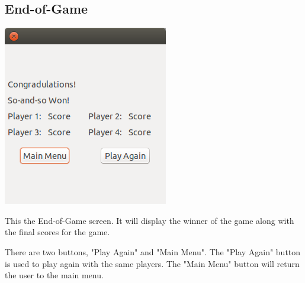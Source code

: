\documentclass[]{scrartcl}
\begin{document}
\subsection{End-of-Game}
\centerline{\includegraphics{end_game.png}}
This the End-of-Game screen. It will display the winner of the game along with the final scores for the game.

 There are two buttons, "Play Again" and "Main Menu". The "Play Again" button is used to play again with the same players. The "Main Menu" button will return the user to the main menu.
\end{document}
